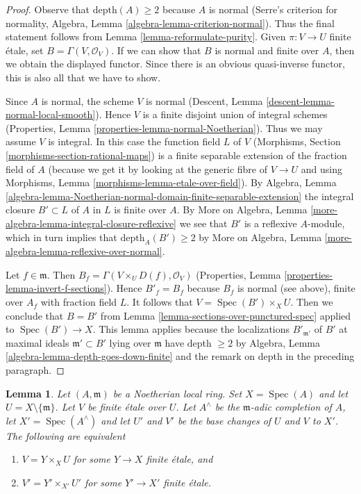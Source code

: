 \documentclass{stacks-project}
\theoremstyle{plain}
\newtheorem{lemma}[subsection]{Lemma}
\theoremstyle{definition}
\theoremstyle{remark}
\numberwithin{equation}{subsection}
\def\Spec{\mathop{\mathrm{Spec}}}
\begin{document}
\begin{proof}
Observe that $\text{depth}(A) \geq 2$ because $A$ is normal
(Serre's criterion for normality, Algebra, Lemma
\ref{algebra-lemma-criterion-normal}).
Thus the final statement follows from Lemma \ref{lemma-reformulate-purity}.
Given $\pi : V \to U$ finite \'etale, set $B = \Gamma(V, \mathcal{O}_V)$.
If we can show that $B$ is normal and finite over $A$, then
we obtain the displayed functor. Since there is an obvious
quasi-inverse functor, this is also all that we have to show.

\medskip\noindent
Since $A$ is normal, the scheme $V$ is normal
(Descent, Lemma \ref{descent-lemma-normal-local-smooth}).
Hence $V$ is a finite disjoint union of integral schemes
(Properties, Lemma \ref{properties-lemma-normal-Noetherian}).
Thus we may assume $V$ is integral.
In this case the function field $L$ of $V$
(Morphisms, Section \ref{morphisms-section-rational-maps})
is a finite separable extension of the fraction field of $A$
(because we get it by looking at the generic fibre
of $V \to U$ and using Morphisms, Lemma
\ref{morphisms-lemma-etale-over-field}).
By Algebra, Lemma
\ref{algebra-lemma-Noetherian-normal-domain-finite-separable-extension}
the integral closure $B' \subset L$ of $A$ in $L$ is finite over $A$.
By More on Algebra, Lemma \ref{more-algebra-lemma-integral-closure-reflexive}
we see that $B'$ is a reflexive $A$-module, which in turn implies
that $\text{depth}_A(B') \geq 2$ by
More on Algebra, Lemma \ref{more-algebra-lemma-reflexive-over-normal}.

\medskip\noindent
Let $f \in \mathfrak m$. Then $B_f = \Gamma(V \times_U D(f), \mathcal{O}_V)$
(Properties, Lemma \ref{properties-lemma-invert-f-sections}).
Hence $B'_f = B_f$ because $B_f$ is normal (see above),
finite over $A_f$ with fraction field $L$.
It follows that $V = \Spec(B') \times_X U$.
Then we conclude that $B = B'$ from
Lemma \ref{lemma-sections-over-punctured-spec}
applied to $\Spec(B') \to X$.
This lemma applies because the localizations $B'_{\mathfrak m'}$
of $B'$ at maximal ideals $\mathfrak m' \subset B'$ lying over
$\mathfrak m$ have depth $\geq 2$ by
Algebra, Lemma \ref{algebra-lemma-depth-goes-down-finite}
and the remark on depth in the preceding paragraph.
\end{proof}

\begin{lemma}
\label{lemma-purity-and-completion}
Let $(A, \mathfrak m)$ be a Noetherian local ring. Set $X = \Spec(A)$
and let $U = X \setminus \{\mathfrak m\}$.
Let $V$ be finite \'etale over $U$.
Let $A^\wedge$ be the $\mathfrak m$-adic completion of $A$,
let $X' = \Spec(A^\wedge)$ and let $U'$ and $V'$ be the base changes of
$U$ and $V$ to $X'$. The following are equivalent
\begin{enumerate}
\item $V = Y \times_X U$ for some $Y \to X$ finite \'etale, and
\item $V' = Y' \times_{X'} U'$ for some $Y' \to X'$ finite \'etale.
\end{enumerate}
\end{lemma}
\end{document}
